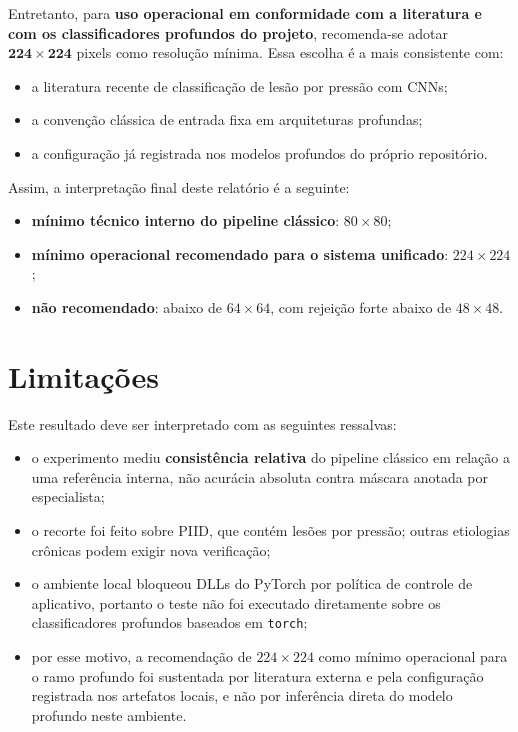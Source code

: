 \documentclass[
    12pt,
    openright,
    oneside,
    a4paper,
    chapter=TITLE,
    section=TITLE,
    brazil,
    sumario=tradicional,
    hidelinks
]{abntex2}
\begin{document}
Entretanto, para \textbf{uso operacional em conformidade com a literatura e com os classificadores profundos do projeto}, recomenda-se adotar \(\mathbf{224 \times 224}\) pixels como resolução mínima. Essa escolha é a mais consistente com:
\begin{itemize}
    \item a literatura recente de classificação de lesão por pressão com CNNs;
    \item a convenção clássica de entrada fixa em arquiteturas profundas;
    \item a configuração já registrada nos modelos profundos do próprio repositório.
\end{itemize}

Assim, a interpretação final deste relatório é a seguinte:
\begin{itemize}
    \item \textbf{mínimo técnico interno do pipeline clássico}: \(80 \times 80\);
    \item \textbf{mínimo operacional recomendado para o sistema unificado}: \(224 \times 224\);
    \item \textbf{não recomendado}: abaixo de \(64 \times 64\), com rejeição forte abaixo de \(48 \times 48\).
\end{itemize}

\section{Limitações}
Este resultado deve ser interpretado com as seguintes ressalvas:
\begin{itemize}
    \item o experimento mediu \textbf{consistência relativa} do pipeline clássico em relação a uma referência interna, não acurácia absoluta contra máscara anotada por especialista;
    \item o recorte foi feito sobre PIID, que contém lesões por pressão; outras etiologias crônicas podem exigir nova verificação;
    \item o ambiente local bloqueou DLLs do PyTorch por política de controle de aplicativo, portanto o teste não foi executado diretamente sobre os classificadores profundos baseados em \texttt{torch};
    \item por esse motivo, a recomendação de \(224 \times 224\) como mínimo operacional para o ramo profundo foi sustentada por literatura externa e pela configuração registrada nos artefatos locais, e não por inferência direta do modelo profundo neste ambiente.
\end{itemize}
\end{document}
